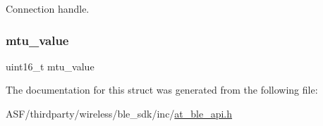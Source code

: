 Connection handle. 

\mbox{\label{structat__ble__mtu__changed__ind__t_a1a5545fe8d67ae23337095aed768e9e8}} 
\subsubsection{\texorpdfstring{mtu\_value}{mtu\_value}}
{\footnotesize\ttfamily uint16\+\_\+t mtu\+\_\+value}



The documentation for this struct was generated from the following file\+:\begin{DoxyCompactItemize}
\item 
A\+S\+F/thirdparty/wireless/ble\+\_\+sdk/inc/\mbox{\hyperlink{at__ble__api_8h}{at\+\_\+ble\+\_\+api.\+h}}\end{DoxyCompactItemize}
